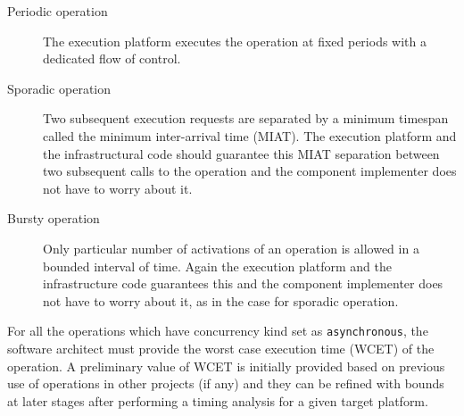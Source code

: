 \begin{description}
\begin{description}
\item [Periodic operation] The execution platform executes the operation at fixed periods with a dedicated flow of control.
\item [Sporadic operation] Two subsequent execution requests are separated by a minimum timespan called the minimum inter-arrival time (MIAT). The execution platform and the infrastructural code should guarantee this MIAT separation between two subsequent calls to the operation and the component implementer does not have to worry about it.
\item [Bursty operation] Only particular number of activations of an operation is allowed in a bounded interval of time. Again the execution platform and the infrastructure code guarantees this and the component implementer does not have to worry about it, as in the case for sporadic operation.
\end{description}

For all the operations which have concurrency kind set as \texttt{asynchronous}, the software architect must provide the worst case execution time (WCET) of the operation. A preliminary value of WCET is initially provided based on previous use of operations in other projects (if any) and they can be refined with bounds at later stages after performing a timing analysis for a given target platform.


\end{description}
